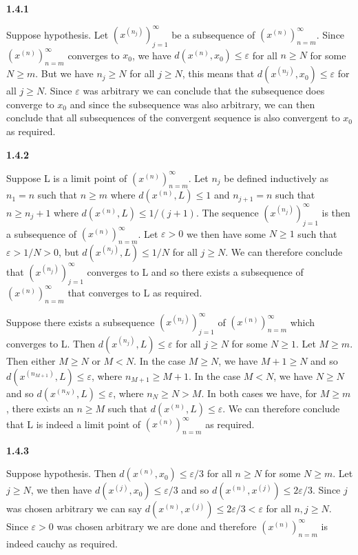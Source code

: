 \documentclass[12pt]{article}
\begin{document}
\textbf{1.4.1}

Suppose hypothesis. Let $(x^{(n_j)})_{j=1}^\infty$ be a subsequence of $(x^{(n)})^\infty_{n=m}$. Since $(x^{(n)})^\infty_{n=m}$ converges to $x_0$, we have $d(x^{(n)},x_0)\leq \varepsilon$ for all $n\geq N$ for some $N\geq m$. But we have $n_j\geq N$ for all $j\geq N$, this means that $d(x^{(n_j)},x_0)\leq \varepsilon$ for all $j\geq N$. Since $\varepsilon $ was arbitrary we can conclude that the subsequence does converge to $x_0$ and since the subsequence was also arbitrary, we can then conclude that all subsequences of the convergent sequence is also convergent to $x_0$ as required.

\textbf{1.4.2}

Suppose L is a limit point of $(x^{(n)})^\infty_{n=m}$. Let $n_j$ be defined inductively as $n_1 = n$ such that $n\geq m$ where $d(x^{(n)},L)\leq 1$ and $ n_{j+1}=n$ such that $n\geq n_{j}+1$ where $d(x^{(n)},L)\leq 1/(j+1)$. The sequence $(x^{(n_j)})_{j=1}^\infty$ is then a subsequence of $(x^{(n)})^\infty_{n=m}$. Let $\varepsilon>0$ we then have some $N\geq 1$ such that $ \varepsilon >1/N>0 $, but $d(x^{(n_j)},L)\leq 1/N$ for all $j\geq N$. We can therefore conclude that $(x^{(n_j)})_{j=1}^\infty$ converges to L and so there exists a subsequence of $(x^{(n)})^\infty_{n=m}$ that converges to L as required.

Suppose there exists a subsequence $(x^{(n_j)})_{j=1}^\infty$ of $(x^{(n)})^\infty_{n=m}$ which converges to L. Then $d(x^{(n_j)},L) \leq \varepsilon$ for all $j\geq N$ for some $N\geq 1$. Let $M\geq m$. Then either $M\geq N$ or $M<N$. In the case $M\geq N$, we have $M+1\geq N$ and so $d(x^{(n_{M+1})},L) \leq \varepsilon$, where $n_{M+1}\geq M+1$. In the case $M<N$, we have $N\geq N$ and so $d(x^{(n_{N})},L)\leq \varepsilon$, where $n_N\geq N>M$. In both cases we have, for $M\geq m$, there exists an $n\geq M$ such that $d(x^{(n)}, L)\leq \varepsilon$. We can therefore conclude that L is indeed a limit point of $(x^{(n)})^\infty_{n=m}$ as required. 

\textbf{1.4.3}

Suppose hypothesis. Then $d(x^{(n)},x_0) \leq \varepsilon/3$ for all $n\geq N$ for some $N\geq m$. Let $j\geq N$, we then have $d(x^{(j)}, x_0)\leq \varepsilon/3$ and so $d(x^{(n)},x^{(j)}) \leq 2\varepsilon/3$. Since $j$ was chosen arbitrary we can say $d(x^{(n)},x^{(j)}) \leq 2\varepsilon/3< \varepsilon$ for all $n,j\geq N$. Since $\varepsilon>0$ was chosen arbitrary we are done and therefore $(x^{(n)})^\infty_{n=m}$ is indeed cauchy as required. 
\end{document}
